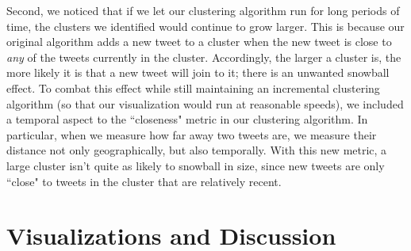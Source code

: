 \documentclass[pdftex,12pt,a4paper]{article}
\begin{document}
Second, we noticed that if we let our clustering algorithm run for long periods of time, the clusters we identified would continue to grow larger. This is because our original algorithm adds a new tweet to a cluster when the new tweet is close to \emph{any} of the tweets currently in the cluster. Accordingly, the larger a cluster is, the more likely it is that a new tweet will join to it; there is an unwanted snowball effect. To combat this effect while still maintaining an incremental clustering algorithm (so that our visualization would run at reasonable speeds), we included a temporal aspect to the ``closeness" metric in our clustering algorithm. In particular, when we measure how far away two tweets are, we measure their distance not only geographically, but also temporally. With this new metric, a large cluster isn't quite as likely to snowball in size, since new tweets are only ``close" to tweets in the cluster that are relatively recent. 

\section{Visualizations and Discussion} 
\end{document}
